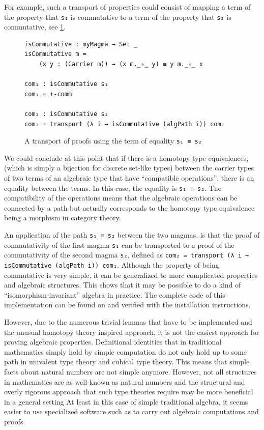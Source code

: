 \documentclass[12pt,a4paper,twoside,xetex]{book}
\begin{document}
For example, such a transport of properties could consist of mapping a term of the property that \texttt{s₁} is commutative to a term of the property that \texttt{s₂} is commutative, see \cref{comtrans}.

\begin{figure}\label{comtrans}
\begin{BVerbatim}
isCommutative : myMagma → Set _
isCommutative m = 
    (x y : (Carrier m)) → (x m._✧_ y) ≡ y m._✧_ x

com₁ : isCommutative s₁
com₁ = +-comm

com₂ : isCommutative s₂
com₂ = transport (λ i → isCommutative (algPath i)) com₁
\end{BVerbatim}
\caption{A transport of proofs using the term of equality \texttt{s₁ ≡ s₂}}
\end{figure}


We could conclude at this point that if there is a homotopy type equivalences, (which is simply a bijection for discrete set-like types) between the carrier types of two terms of an algebraic type that have ``compatible operations'', there is an equality between the terms. In this case, the equality is \texttt{s₁ ≡ s₂}. The compatibility of the operations means that the algebraic operations can be connected by a path but actually corresponds to the homotopy type equivalence being a morphism in category theory.


An application of the path \texttt{s₁ ≡ s₂} between the two magmas, is that the proof of commutativity of the first magma \texttt{s₁} can be transported to a proof of the commutativity of the second magma \texttt{s₂}, defined as \texttt{com₂ = transport (λ i → isCommutative (algPath i)) com₁}. Although the property of being commutative is very simple, it can be generalized to more complicated properties and algebraic structures. This shows that it may be possible to do a kind of ``isomorphism-invariant'' algebra in practice.  The complete code of this implementation can be found on \cite{Van19} and verified with the installation instructions.

However, due to the numerous trivial lemmas that have to be implemented and the unusual homotopy theory inspired approach, it is not the easiest approach for proving algebraic properties. Definitional identities that in traditional mathematics simply hold by simple computation do not only hold up to some path in univalent type theory and cubical type theory. This means that simple facts about natural numbers are not simple anymore. However, not all structures in mathematics are as well-known as natural numbers and the structural and overly rigorous approach that such type theories require may be more beneficial in a general setting At least in this case of simple traditional algebra, it seems easier to use specialized software such as \cite{TheGAPGroup2018} to carry out algebraic computations and proofs.
\end{document}
